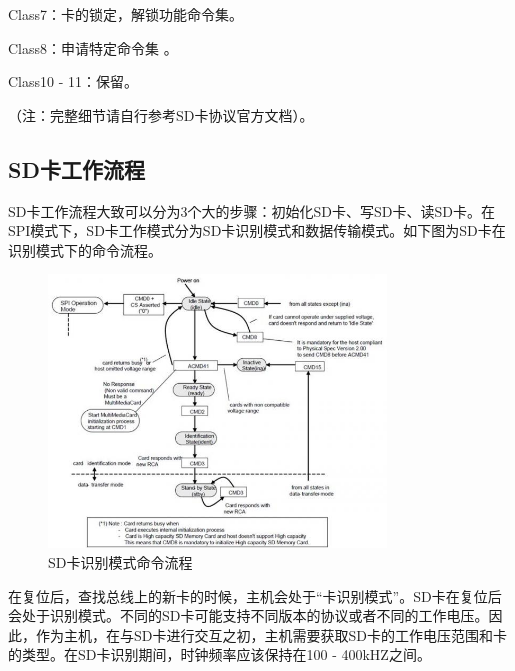 Class7：卡的锁定，解锁功能命令集。

Class8：申请特定命令集 。

Class10 - 11：保留。

（注：完整细节请自行参考SD卡协议官方文档）。

\subsection{SD卡工作流程}

SD卡工作流程大致可以分为3个大的步骤：初始化SD卡、写SD卡、读SD卡。在SPI模式下，SD卡工作模式分为SD卡识别模式和数据传输模式。如下图为SD卡在识别模式下的命令流程。

\begin{figure}[H]
    \centering
    \includegraphics[width=0.8\textwidth]{figures/06-02-命令流程.png}
    \caption{SD卡识别模式命令流程}
\end{figure}


在复位后，查找总线上的新卡的时候，主机会处于“卡识别模式”。SD卡在复位后会处于识别模式。不同的SD卡可能支持不同版本的协议或者不同的⼯作电压。因此，作为主机，在与SD卡进行交互之初，主机需要获取SD卡的工作电压范围和卡的类型。在SD卡识别期间，时钟频率应该保持在100 - 400kHZ之间。

